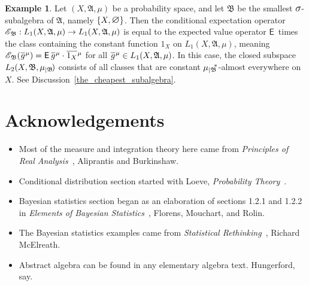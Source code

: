 \documentclass[
twoside=true,
paper=letter,
fontsize=9pt,
pagesize=auto,
leqno,
openany,
headsepline,
overfullrule,
]{scrbook}
\theoremstyle{plain}
\theoremstyle{plain}
\theoremstyle{definition}
\newtheorem{example}[thm]{Example}
\theoremstyle{bfnoteitalic}
\theoremstyle{bfnoteroman}
\newcommand{\sigalg}[1]{\mathfrak{#1}}
\newcommand{\cali}[1]{\mathscr{#1}}
\newcommand{\sfop}[1]{\mathsf{#1}}
\newcommand{\expval}{\sfop{E}\,}
\newcommand{\condexpop}[1]{\mathop{\cali{E}\hspace{-1pt}}\nolimits_{#1}}
\newcommand{\textsigma}{\hbox{\large{$\sigma$}}\kern-1pt}
\newcommand{\restrictedto}[1]{_{\lvert#1}\kern-1.5pt}
\newcommand{\mtset}{\hbox{\large{$\varnothing$}}}
\newcommand{\sigmaalgebra}{\sigalg{A}}
\newcommand{\sigmaalgebraii}{\sigalg{B}}
\newcommand{\Psubstar}[1]{\measure\restrictedto{#1}\kern-2pt^*}
\newcommand{\Lone}{L_1(\measurespace, \sigmaalgebra, \measure)}
\newcommand{\oneonomega}{1_\measurespace}
\newcommand{\sigalgb}{\sigmaalgebraii}
\newcommand{\functionii}{g}
\newcommand{\measurespace}{X}
\newcommand{\measure}{\mu}
\newcommand*\xbar[1]{%
   \hbox{%
     \vbox{%
       \hrule height 0.4pt %
       \kern0.4ex%
       \hbox{%
         \ensuremath{#1}%
       }%
     }%
   }%
}
\newcommand{\lebclass}[1]{\hspace{.5pt}\xbar{#1}\hspace{0.5pt}}
\newcommand{\ellclass}[2]{\lebclass{#1}^{#2}}
\begin{document}
\begin{example}
Let $(\measurespace, \sigmaalgebra,\measure)$ be a  probability space, and let
$\sigmaalgebraii$ be the smallest $\textsigma$-subalgebra of $\sigmaalgebra$, namely $\{\measurespace, \mtset\}$.
Then the conditional expectation operator
$\condexpop{\sigmaalgebraii} :\Lone\to\Lone$ is equal to the expected value operator $\expval$ times the class containing the constant function $\oneonomega$
on
$\Lone$, meaning
$\condexpop{\sigmaalgebraii}(\ellclass{\functionii}{\measure})
= \expval{\ellclass{\functionii}{\measure}}\cdot\ellclass{\oneonomega}{\measure}$
for all $\ellclass{\functionii}{\measure} \in \Lone$. In this case, the closed subspace $L_2(\measurespace, \sigmaalgebraii,\measure\restrictedto{\sigmaalgebraii})$ consists of all classes that are constant $\Psubstar{\sigalgb}$-almost everywhere on $\measurespace$.
See Discussion~\ref{the_cheapest_subalgebra}.
\end{example}








\chapter{Acknowledgements}
\begin{itemize}
\item
Most of the measure and integration theory here came from
\textsl{Principles of Real Analysis}~\cite{pora_aliprantis_1990}, Aliprantis and Burkinshaw.
\item
Conditional distribution section started with Loeve,
\textsl{Probability Theory}~\cite{pt_loeve_1960}.
\item
Bayesian statistics section began as an elaboration of sections 1.2.1 and 1.2.2 in
\textsl{Elements of Bayesian Statistics}~\cite{eobs_florens_1990}, Florens, Mouchart, and Rolin.
\item
The Bayesian statistics examples came from
\textsl{Statistical Rethinking}~\cite{sr_mcelreath_2020}, Richard McElreath.
\item
Abstract algebra can be found in any elementary algebra text. Hungerford, say.
\end{itemize}
\end{document}
